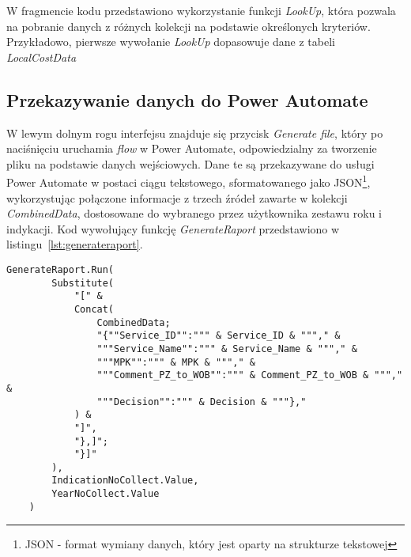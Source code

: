 W fragmencie kodu przedstawiono wykorzystanie funkcji \textit{LookUp}, która pozwala na pobranie danych z różnych kolekcji na podstawie określonych kryteriów. Przykładowo, pierwsze wywołanie \textit{LookUp} dopasowuje dane z tabeli \textit{LocalCostData}



\subsection{Przekazywanie danych do Power Automate}

W lewym dolnym rogu interfejsu znajduje się przycisk \textit{Generate file}, który po naciśnięciu uruchamia \textit{flow} w Power Automate, odpowiedzialny za tworzenie pliku na podstawie danych wejściowych. Dane te są przekazywane do usługi Power Automate w postaci ciągu tekstowego, sformatowanego jako JSON\footnote{JSON - format wymiany danych, który jest oparty na strukturze tekstowej}, wykorzystując połączone informacje z trzech źródeł zawarte w kolekcji \textit{CombinedData}, dostosowane do wybranego przez użytkownika zestawu roku i indykacji. Kod wywołujący funkcję \textit{GenerateRaport} przedstawiono w listingu~\ref{lst:generateraport}.



\begin{lstlisting}[language=PowerFx, caption={Kod wywołujący funkcję GenerateRaport}, label={lst:generateraport}]
    GenerateRaport.Run(
        Substitute(
            "[" & 
            Concat(
                CombinedData;
                "{""Service_ID"":""" & Service_ID & """," &
                """Service_Name"":""" & Service_Name & """," &
                """MPK"":""" & MPK & """," &
                """Comment_PZ_to_WOB"":""" & Comment_PZ_to_WOB & """," &
                """Decision"":""" & Decision & """},"
            ) & 
            "]",
            "},]"; 
            "}]"
        ),
        IndicationNoCollect.Value,
        YearNoCollect.Value
    )
    \end{lstlisting}

